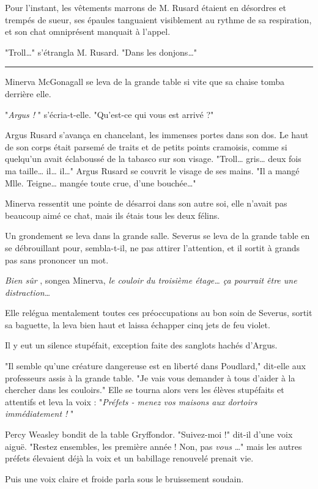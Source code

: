 Pour l'instant, les vêtements marrons de M. Rusard étaient en désordres et trempés de sueur, ses épaules tanguaient visiblement au rythme de sa respiration, et son chat omniprésent manquait à l'appel.

"Troll…" s'étrangla M. Rusard. "Dans les donjons…"
\par\noindent\rule{\textwidth}{0.4pt}
Minerva McGonagall se leva de la grande table si vite que sa chaise tomba derrière elle.

"\emph{Argus !} " s'écria-t-elle. "Qu'est-ce qui vous est arrivé ?"

Argus Rusard s'avança en chancelant, les immenses portes dans son dos. Le haut de son corps était parsemé de traits et de petits points cramoisis, comme si quelqu'un avait éclaboussé de la tabasco sur son visage. "Troll… gris… deux fois ma taille… il… il…" Argus Rusard se couvrit le visage de ses mains. "Il a mangé Mlle. Teigne… mangée toute crue, d'une bouchée…"

Minerva ressentit une pointe de désarroi dans son autre soi, elle n'avait pas beaucoup aimé ce chat, mais ils étais tous les deux félins.

Un grondement se leva dans la grande salle. Severus se leva de la grande table en se débrouillant pour, sembla-t-il, ne pas attirer l'attention, et il sortit à grands pas sans prononcer un mot.

\emph{Bien sûr} , songea Minerva, \emph{le couloir du troisième étage… ça pourrait être une distraction…} 

Elle relégua mentalement toutes ces préoccupations au bon soin de Severus, sortit sa baguette, la leva bien haut et laissa échapper cinq jets de feu violet.

Il y eut un silence stupéfait, exception faite des sanglots hachés d'Argus.

"Il semble qu'une créature dangereuse est en liberté dans Poudlard," dit-elle aux professeurs assis à la grande table. "Je vais vous demander à tous d'aider à la chercher dans les couloirs." Elle se tourna alors vers les élèves stupéfaits et attentifs et leva la voix : "\emph{Préfets - menez vos maisons aux dortoirs immédiatement !} "

Percy Weasley bondit de la table Gryffondor. "Suivez-moi !" dit-il d'une voix aiguë. "Restez ensembles, les première année ! Non, pas \emph{vous} …" mais les autres préfets élevaient déjà la voix et un babillage renouvelé prenait vie.

Puis une voix claire et froide parla sous le bruissement soudain.

